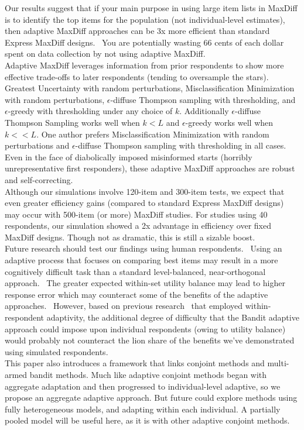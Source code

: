 \documentclass[a4paper,12pt]{article}
\begin{document}
Our results suggest that if your main purpose in using large item lists in MaxDiff is to identify the top items for the population (not individual-level estimates), then adaptive MaxDiff approaches can be 3x more efficient than standard Express MaxDiff designs.  You are potentially wasting 66 cents of each dollar spent on data collection by not using adaptive MaxDiff.\\
Adaptive MaxDiff leverages information from prior respondents to show more effective trade-offs to later respondents (tending to oversample the stars). Greatest Uncertainty with random perturbations, Misclassification Minimization with random perturbations, $\epsilon$-diffuse Thompson sampling with thresholding, and $\epsilon$-greedy with thresholding under any choice of $k$. Additionally $\epsilon$-diffuse Thompson Sampling works well when $k<L$ and $\epsilon$-greedy works well when $k<<L$. One author prefers Misclassification Minimization with random perturbations and $\epsilon$-diffuse Thompson sampling with thresholding in all cases.\\
Even in the face of diabolically imposed misinformed starts (horribly unrepresentative first responders), these adaptive MaxDiff approaches are robust and self-correcting.\\
Although our simulations involve 120-item and 300-item tests, we expect that even greater efficiency gains (compared to standard Express MaxDiff designs) may occur with 500-item (or more) MaxDiff studies. For studies using 40 respondents, our simulation showed a 2x advantage in efficiency over fixed MaxDiff designs. Though not as dramatic, this is still a sizable boost.\\
Future research should test our findings using human respondents.  Using an adaptive process that focuses on comparing best items may result in a more cognitively difficult task than a standard level-balanced, near-orthogonal approach.  The greater expected within-set utility balance may lead to higher response error which may counteract some of the benefits of the adaptive approaches.  However, based on previous research~\cite{orme2006adaptive} that employed within-respondent adaptivity, the additional degree of difficulty that the Bandit adaptive approach could impose upon individual respondents (owing to utility balance) would probably not counteract the lion share of the benefits we've demonstrated using simulated respondents.\\
This paper also introduces a framework that links conjoint methods and multi-armed bandit methods. Much like adaptive conjoint methods began with aggregate adaptation and then progressed to individual-level adaptive, so we propose an aggregate adaptive approach. But future could explore methods using fully heterogeneous models, and adapting within each individual. A partially pooled model will be useful here, as it is with other adaptive conjoint methods. \\
\end{document}
